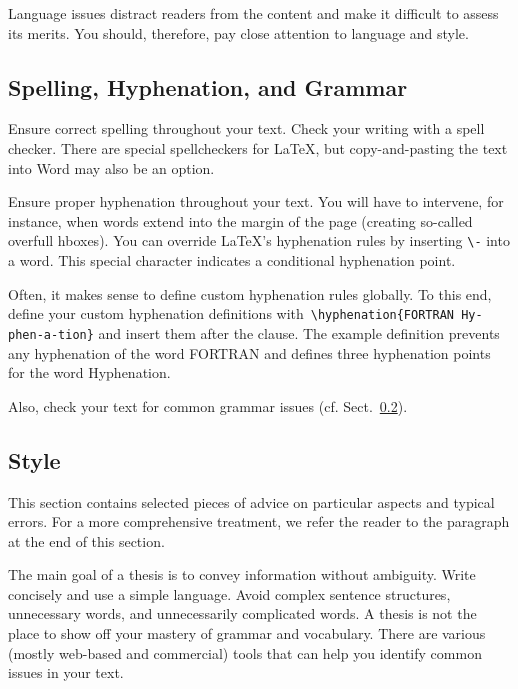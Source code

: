 Language issues distract readers from the content and make it difficult to assess its merits. You should, therefore, pay close attention to language and style.

\subsection{Spelling, Hyphenation, and Grammar}

Ensure correct spelling throughout your text. Check your writing with a spell checker. There are special spellcheckers for LaTeX, but copy-and-pasting the text into Word may also be an option.

Ensure proper hyphenation throughout your text. You will have to intervene, for instance, when words extend into the margin of the page (creating so-called overfull hboxes). You can override LaTeX's hyphenation rules by inserting \verb|\-| into a word. This special character indicates a conditional hyphenation point.

Often, it makes sense to define custom hyphenation rules globally. To this end, define your custom hyphenation definitions with\ \verb|\hyphenation{FORTRAN Hy-phen-a-tion}| and insert them after the \verb|| clause.
The example definition prevents any hyphenation of the word FORTRAN and defines three hyphenation points for the word Hyphenation.

Also, check your text for common grammar issues (cf. Sect.~\ref{sec:style}).

\subsection{Style}
\label{sec:style}

This section contains selected pieces of advice on particular aspects and typical errors. For a more comprehensive treatment, we refer the reader to the paragraph  at the end of this section.

The main goal of a thesis is to convey information without ambiguity. Write concisely and use a simple language. Avoid complex sentence structures, unnecessary words, and unnecessarily complicated words. A thesis is not the place to show off your mastery of grammar and vocabulary. There are various (mostly web-based and commercial) tools%
that can help you identify common issues in your text.


